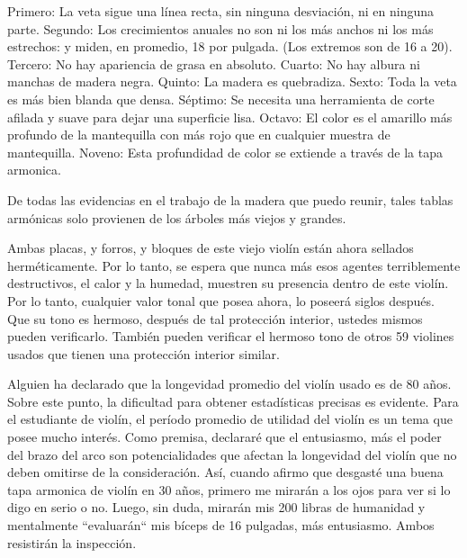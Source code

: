 \documentclass[12pt]{book}
\begin{document}
Primero: La veta sigue una línea recta, sin ninguna desviación, ni en ninguna parte. Segundo: Los crecimientos anuales no son ni los más anchos ni los más estrechos: y miden, en promedio, 18 por pulgada. (Los extremos son de 16 a 20). Tercero: No hay apariencia de grasa en absoluto. Cuarto: No hay albura ni manchas de madera negra. Quinto: La madera es quebradiza. Sexto: Toda la veta es más bien blanda que densa. Séptimo: Se necesita una herramienta de corte afilada y suave para dejar una superficie lisa. Octavo: El color es el amarillo más profundo de la mantequilla con más rojo que en cualquier muestra de mantequilla. Noveno: Esta profundidad de color se extiende a través de la tapa armonica.

De todas las evidencias en el trabajo de la madera que puedo reunir, tales tablas armónicas solo provienen de los árboles más viejos y grandes.

Ambas placas, y forros, y bloques de este viejo violín están ahora sellados herméticamente. Por lo tanto, se espera que nunca más esos agentes terriblemente destructivos, el calor y la humedad, muestren su presencia dentro de este violín. Por lo tanto, cualquier valor tonal que posea ahora, lo poseerá siglos después. Que su tono es hermoso, después de tal protección interior, ustedes mismos pueden verificarlo. También pueden verificar el hermoso tono de otros 59 violines usados que tienen una protección interior similar.

Alguien ha declarado que la longevidad promedio del violín usado es de 80 años. Sobre este punto, la dificultad para obtener estadísticas precisas es evidente. Para el estudiante de violín, el período promedio de utilidad del violín es un tema que posee mucho interés. Como premisa, declararé que el entusiasmo, más el poder del brazo del arco son potencialidades que afectan la longevidad del violín que no deben omitirse de la consideración. Así, cuando afirmo que desgasté una buena tapa armonica de violín en 30 años, primero me mirarán a los ojos para ver si lo digo en serio o no. Luego, sin duda, mirarán mis 200 libras de humanidad y mentalmente ``evaluarán`` mis bíceps de 16 pulgadas, más entusiasmo. Ambos resistirán la inspección.
\end{document}
